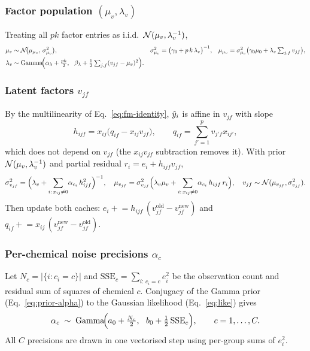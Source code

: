 \subsubsection{Factor population $(\mu_v,\lambda_v)$}
Treating all $pk$ factor entries as i.i.d.\ $\mathcal{N}(\mu_v,\lambda_v^{-1})$,
\begin{align}
  \mu_v &\sim \mathcal{N}\!\big(\mu_{\mu_v},\,\sigma_{\mu_v}^2\big),
  & \sigma_{\mu_v}^2 &=\big(\gamma_0+p\,k\,\lambda_v\big)^{-1},
  & \mu_{\mu_v} &=\sigma_{\mu_v}^2\big(\gamma_0\mu_0+\lambda_v\textstyle\sum_{j,f}v_{jf}\big), \\
  \lambda_v &\sim \mathrm{Gamma}\!\Big(\alpha_\lambda+\tfrac{p k}{2},\ \
     \beta_\lambda+\tfrac{1}{2}\textstyle\sum_{j,f}(v_{jf}-\mu_v)^2\Big).
\end{align}

\subsubsection{Latent factors $v_{jf}$}
By the multilinearity of Eq.~\eqref{eq:fm-identity}, $\hat{y}_i$ is affine in
$v_{jf}$ with slope
\begin{equation}
  h_{ijf}=x_{ij}\big(q_{if}-x_{ij}v_{jf}\big),
  \qquad q_{if}=\sum_{j'=1}^{p} v_{j'f}x_{ij'},
\end{equation}
which does not depend on $v_{jf}$ (the $x_{ij}v_{jf}$ subtraction removes it).
With prior $\mathcal{N}(\mu_v,\lambda_v^{-1})$ and partial residual
$r_i=e_i+h_{ijf}v_{jf}$,
\begin{equation}
  \sigma_{v_{jf}}^2=\Big(\lambda_v+\sum_{i:\,x_{ij}\neq0}\!\alpha_{c_i}\,h_{ijf}^2\Big)^{-1},
  \quad
  \mu_{v_{jf}}=\sigma_{v_{jf}}^2\Big(\lambda_v\mu_v+\sum_{i:\,x_{ij}\neq0}\!\alpha_{c_i}\,h_{ijf}\,r_i\Big),
  \quad
  v_{jf}\sim\mathcal{N}(\mu_{v_{jf}},\sigma_{v_{jf}}^2).
\end{equation}
Then update both caches: $e_i \mathrel{+}= h_{ijf}\,(v_{jf}^{\mathrm{old}}-v_{jf}^{\mathrm{new}})$
and $q_{if}\mathrel{+}= x_{ij}\,(v_{jf}^{\mathrm{new}}-v_{jf}^{\mathrm{old}})$.

\subsubsection{Per-chemical noise precisions $\alpha_c$}
Let $N_c=|\{i:c_i=c\}|$ and $\mathrm{SSE}_c=\sum_{i:\,c_i=c} e_i^2$ be the
observation count and residual sum of squares of chemical $c$. Conjugacy of the
Gamma prior (Eq.~\ref{eq:prior-alpha}) to the Gaussian likelihood
(Eq.~\ref{eq:like}) gives
\begin{equation}
  \alpha_c \;\sim\; \Gam\!\Big(a_0+\tfrac{N_c}{2},\ \ b_0+\tfrac{1}{2}\,\mathrm{SSE}_c\Big),
  \qquad c=1,\dots,C.
  \label{eq:post-alpha}
\end{equation}
All $C$ precisions are drawn in one vectorised step using per-group sums of
$e_i^2$.

